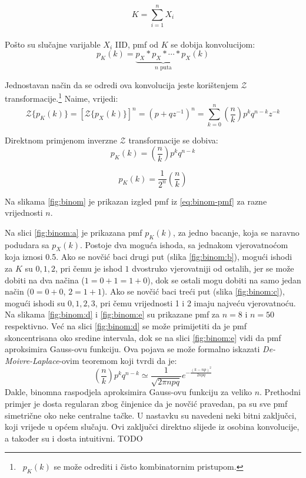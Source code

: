 
$$K = \sum_{i=1}^{n} X_i$$
\\

Pošto su slučajne varijable $X_i$ IID, pmf od $K$ se dobija konvolucijom:
$$p_K(k) = \underbrace{p_X * p_X * \cdots * p_X}_{n\text{ puta}}(k)$$

Jednostavan način da se odredi ova konvolucija jeste korištenjem
$\mathcal{Z}$ transformacije.\footnote{\ $p_K(k)$ se može odrediti i čisto
kombinatornim pristupom.}
Naime, vrijedi: %
\begin{equation}
  \mathcal{Z}\{p_K(k)\}
  = \left[\mathcal{Z}\{p_X(k)\}\right]^n
  = (p+qz^{-1})^n
  = \sum_{k=0}^{n} \left(\frac{n}{k}\right) p^k q^{n-k} z^{-k}
\end{equation}

Direktnom primjenom inverzne $ \mathcal{Z}$ transformacije se dobiva:
$$p_K(k) = \left(\frac{n}{k}\right) p^kq^{n-k}$$

\begin{equation} \label{eq:binom-pmf}
  p_K(k) = \frac{1}{2^n} \left(\frac{n}{k}\right)
\end{equation}

Na slikama \ref{fig:binom} je prikazan izgled pmf iz \eqref{eq:binom-pmf} za
razne vrijednosti $n$.

Na slici \ref{fig:binom:a} je prikazana pmf $p_K(k)$, za jedno bacanje, koja se
naravno podudara sa $p_X(k)$. Postoje dva moguća ishoda, sa jednakom
vjerovatnoćom koja iznosi 0.5. Ako se novčić baci drugi put (slika
\ref{fig:binom:b}), mogući ishodi za $K$ su $0, 1, 2$, pri čemu je ishod $1$
dvostruko vjerovatniji od ostalih, jer se može dobiti na dva načina
($1=0+1=1+0$), dok se ostali mogu dobiti na samo jedan način ($0=0+0$, $2=1+1$).
Ako se novčić baci treći put (slika \ref{fig:binom:c}), mogući ishodi su
$0,1,2,3$, pri čemu vrijednosti 1 i 2 imaju najveću vjerovatnoću. Na slikama
\ref{fig:binom:d} i \ref{fig:binom:e} su prikazane pmf za $n=8$ i $n=50$
respektivno. Već na slici \ref{fig:binom:d} se može primijetiti da je pmf
skoncentrisana oko sredine intervala, dok se na slici \ref{fig:binom:e} vidi da
pmf aproksimira Gauss-ovu funkciju. Ova pojava se može formalno iskazati
\textit{De-Moivre-Laplace}-ovim teoremom koji tvrdi da je:
\begin{equation}
  \left(\frac{n}{k}\right) p^kq^{n-k} \simeq \frac{1}{\sqrt{2\pi npq}}
  e^{-\frac{(k-np)^2}{2npq}}
\end{equation}
Dakle, binomna raspodjela aproksimira Gauss-ovu funkciju za veliko $n$.
Prethodni primjer je dosta regularan zbog činjenice da je novčić pravedan, pa su
sve pmf simetrične oko neke centralne tačke. U nastavku su navedeni neki bitni
zaključci, koji vrijede u općem slučaju. Ovi zaključci direktno slijede iz
osobina konvolucije, a također su i dosta intuitivni.
TODO



